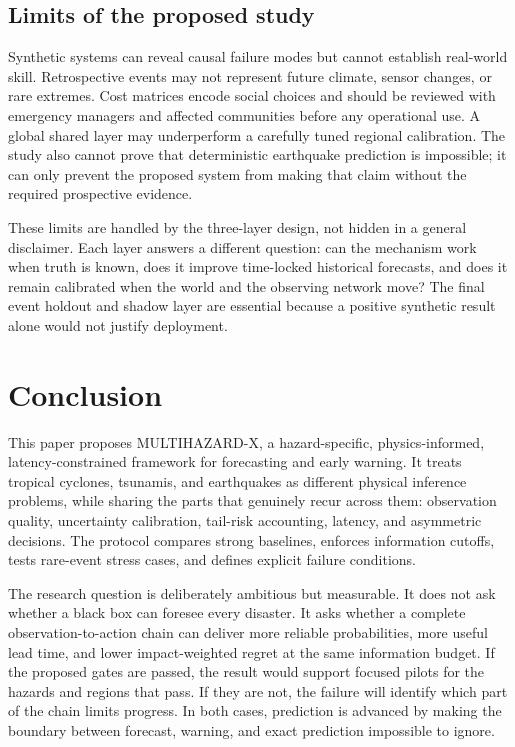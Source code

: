 \documentclass[conference]{IEEEtran}
\begin{document}
\subsection{Limits of the proposed study}

Synthetic systems can reveal causal failure modes but cannot establish real-world skill. Retrospective events may not represent future climate, sensor changes, or rare extremes. Cost matrices encode social choices and should be reviewed with emergency managers and affected communities before any operational use. A global shared layer may underperform a carefully tuned regional calibration. The study also cannot prove that deterministic earthquake prediction is impossible; it can only prevent the proposed system from making that claim without the required prospective evidence.

These limits are handled by the three-layer design, not hidden in a general disclaimer. Each layer answers a different question: can the mechanism work when truth is known, does it improve time-locked historical forecasts, and does it remain calibrated when the world and the observing network move? The final event holdout and shadow layer are essential because a positive synthetic result alone would not justify deployment.

\section{Conclusion}

This paper proposes MULTIHAZARD-X, a hazard-specific, physics-informed, latency-constrained framework for forecasting and early warning. It treats tropical cyclones, tsunamis, and earthquakes as different physical inference problems, while sharing the parts that genuinely recur across them: observation quality, uncertainty calibration, tail-risk accounting, latency, and asymmetric decisions. The protocol compares strong baselines, enforces information cutoffs, tests rare-event stress cases, and defines explicit failure conditions.

The research question is deliberately ambitious but measurable. It does not ask whether a black box can foresee every disaster. It asks whether a complete observation-to-action chain can deliver more reliable probabilities, more useful lead time, and lower impact-weighted regret at the same information budget. If the proposed gates are passed, the result would support focused pilots for the hazards and regions that pass. If they are not, the failure will identify which part of the chain limits progress. In both cases, prediction is advanced by making the boundary between forecast, warning, and exact prediction impossible to ignore.
\end{document}

